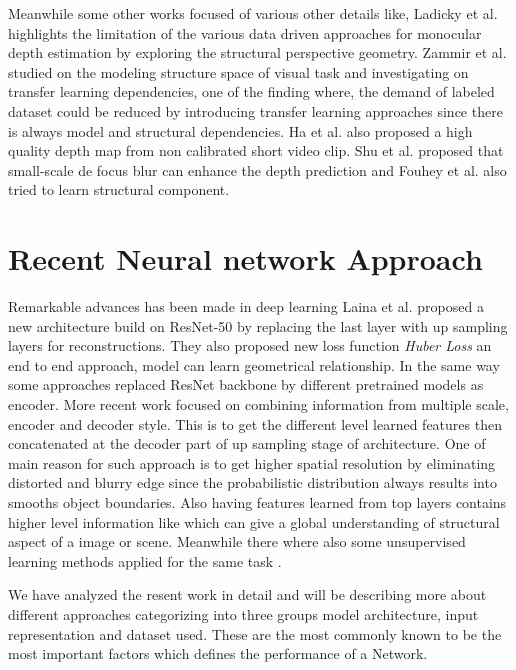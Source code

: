 Meanwhile some other works focused of various other details like,  Ladicky et al. \cite{ladicky2014pulling} highlights the limitation of the various data driven approaches for monocular depth estimation by exploring the structural perspective  geometry. Zammir et al. \cite{zamir2018taskonomy} studied on the modeling structure space of visual task and investigating on transfer learning dependencies, one of the finding where, the demand of labeled dataset could be reduced by introducing transfer learning approaches since there is always model and structural dependencies. Ha et al. \cite{ha2016high} also proposed a high quality depth map from non calibrated short video clip. Shu et al. \cite{Shi2015BreakAR} proposed that small-scale de focus blur can enhance the depth prediction and Fouhey et al. \cite{Fouhey_2013_ICCV} also tried to learn structural component.




\section{Recent Neural network Approach}
\label{Chapter3:RelatedWork_NNModel}
 Remarkable advances has been made in deep learning Laina et al. \cite{laina2016deeper} proposed a new architecture build on ResNet-50 by replacing the last layer with up sampling layers for reconstructions. They also proposed new loss function \textit{Huber Loss} an end to end approach, model can learn geometrical relationship. In the same way some approaches replaced ResNet backbone by different pretrained models as encoder\cite{Alhashim2018, hu2019revisiting}. More recent work focused on combining information from multiple scale, encoder and decoder style. This is to get the different level learned features \cite{Xu_2018_CVPR, Eigen_2015_ICCV} then concatenated at the decoder part of up sampling stage of architecture. One of main reason for such approach is to get higher spatial resolution by eliminating distorted and blurry edge since the probabilistic distribution always results into smooths object boundaries\cite{hu2019revisiting}. Also having features learned from top layers contains higher level information like which can give a global understanding of structural aspect of a image or scene. Meanwhile there where also some unsupervised learning methods applied for the same task \cite{godard2017unsupervised, qi2018geonet}.

We have analyzed the resent work in detail and will be describing more about different approaches categorizing into three groups model architecture, input representation and dataset used. These are the most commonly known to be the most important factors which defines the performance of a Network.

